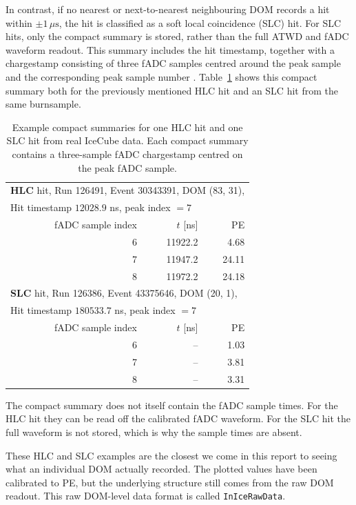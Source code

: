 In contrast, if no nearest or next-to-nearest neighbouring DOM records a hit within $\pm 1\,\mu\mathrm{s}$, the hit is classified as a soft local coincidence (SLC) hit. For SLC hits, only the compact summary is stored, rather than the full ATWD and fADC waveform readout. This summary includes the hit timestamp, together with a chargestamp consisting of three fADC samples centred around the peak sample and the corresponding peak sample number \cite{IceCube2017}. Table~\ref{tab:hlc_slc_readout_example} shows this compact summary both for the previously mentioned HLC hit and an SLC hit from the same burnsample.

\begin{table}[H]
\centering
\begin{tabular}{rrr}
\toprule
\multicolumn{3}{l}{\textbf{HLC} hit, Run 126491, Event 30343391, DOM (83, 31),} \\
\multicolumn{3}{l}{Hit timestamp $12028.9$ ns, peak index $=7$} \\
\midrule
fADC sample index & $t$ [ns] & PE \\
\midrule
6 & 11922.2 & 4.68  \\
7 & 11947.2 & 24.11 \\
8 & 11972.2 & 24.18 \\
\midrule
\multicolumn{3}{l}{\textbf{SLC} hit, Run 126386, Event 43375646, DOM (20, 1),} \\
\multicolumn{3}{l}{Hit timestamp $180533.7$ ns, peak index $=7$} \\
\midrule
fADC sample index & $t$ [ns] & PE \\
\midrule
6 & -- & 1.03 \\
7 & -- & 3.81 \\
8 & -- & 3.31 \\
\bottomrule
\end{tabular}
\caption{Example compact summaries for one HLC hit and one SLC hit from real IceCube data. Each compact summary contains a three-sample fADC chargestamp centred on the peak fADC sample.}
\label{tab:hlc_slc_readout_example}
\end{table}

The compact summary does not itself contain the fADC sample times. For the HLC hit they can be read off the calibrated fADC waveform. For the SLC hit the full waveform is not stored, which is why the sample times are absent.

These HLC and SLC examples are the closest we come in this report to seeing what an individual DOM actually recorded. The plotted values have been calibrated to PE, but the underlying structure still comes from the raw DOM readout. This raw DOM-level data format is called \texttt{InIceRawData}.

